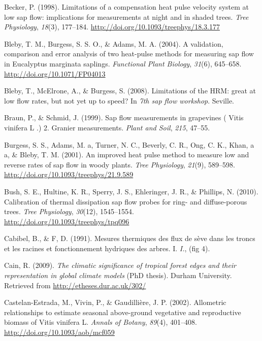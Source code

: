 \documentclass[11pt,twoside]{reedthesis}
\begin{document}
\hypertarget{ref-Becker1998}{}
Becker, P. (1998). Limitations of a compensation heat pulse velocity
system at low sap flow: implications for measurements at night and in
shaded trees. \emph{Tree Physiology}, \emph{18}(3), 177--184.
\url{http://doi.org/10.1093/treephys/18.3.177}

\hypertarget{ref-Bleby2004}{}
Bleby, T. M., Burgess, S. S. O., \& Adams, M. A. (2004). A validation,
comparison and error analysis of two heat-pulse methods for measuring
sap flow in Eucalyptus marginata saplings. \emph{Functional Plant
Biology}, \emph{31}(6), 645--658. \url{http://doi.org/10.1071/FP04013}

\hypertarget{ref-Bleby2008}{}
Bleby, T., McElrone, A., \& Burgess, S. (2008). Limitations of the HRM:
great at low flow rates, but not yet up to speed? In \emph{7th sap flow
workshop}. Seville.

\hypertarget{ref-Braun1999}{}
Braun, P., \& Schmid, J. (1999). Sap flow measurements in grapevines (
Vitis vinifera L .) 2. Granier measurements. \emph{Plant and Soil},
\emph{215}, 47--55.

\hypertarget{ref-Burgess2001}{}
Burgess, S. S., Adams, M. a, Turner, N. C., Beverly, C. R., Ong, C. K.,
Khan, a a, \& Bleby, T. M. (2001). An improved heat pulse method to
measure low and reverse rates of sap flow in woody plants. \emph{Tree
Physiology}, \emph{21}(9), 589--598.
\url{http://doi.org/10.1093/treephys/21.9.589}

\hypertarget{ref-Bush2010}{}
Bush, S. E., Hultine, K. R., Sperry, J. S., Ehleringer, J. R., \&
Phillips, N. (2010). Calibration of thermal dissipation sap flow probes
for ring- and diffuse-porous trees. \emph{Tree Physiology},
\emph{30}(12), 1545--1554. \url{http://doi.org/10.1093/treephys/tpq096}

\hypertarget{ref-Cabibel1991}{}
Cabibel, B., \& F, D. (1991). Mesures thermiques des flux de sève dans
les troncs et les racines et fonctionnement hydriques des arbres. I.
\emph{I.}, (fig 4).

\hypertarget{ref-Cain2009}{}
Cain, R. (2009). \emph{The climatic significance of tropical forest
edges and their representation in global climate models} (PhD thesis).
Durham University. Retrieved from \url{http://etheses.dur.ac.uk/302/}

\hypertarget{ref-Castelan-Estrada2002}{}
Castelan-Estrada, M., Vivin, P., \& Gaudillière, J. P. (2002).
Allometric relationships to estimate seasonal above-ground vegetative
and reproductive biomass of Vitis vinifera L. \emph{Annals of Botany},
\emph{89}(4), 401--408. \url{http://doi.org/10.1093/aob/mcf059}
\end{document}
